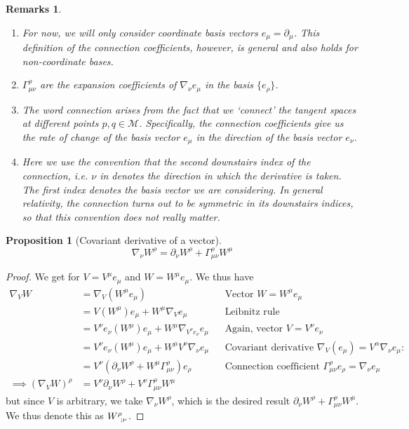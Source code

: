 \documentclass[a4paper]{article}
\newtheorem{remarks}{Remarks}[section]
\theoremstyle{new}
\newtheorem{prop}{Proposition}[section]
\begin{document}
\begin{remarks}\leavevmode
\begin{enumerate}
    \item For now, we will only consider coordinate basis vectors $e_\mu = \partial_\mu$. This definition of the connection coefficients, however, is general and also holds for non-coordinate bases.
    \item $\Gamma_{\mu\nu}^\rho$ are the expansion coefficients of $\nabla_\nu e_\mu$ in the basis $\{e_\rho\}$.
    \item The word connection arises from the fact that we `connect' the tangent spaces at different points $p,q\in\mathcal{M}$. Specifically, the connection coefficients give us the rate of change of the basis vector $e_\mu$ in the direction of the basis vector $e_\nu$.
    \item Here we use the convention that the second downstairs index of the connection, i.e. $\nu$ in denotes the direction in which the derivative is taken. The first index denotes the basis vector we are considering. In general relativity, the connection turns out to be symmetric in its downstairs indices, so that this convention does not really matter.
\end{enumerate}
\end{remarks}
\begin{prop}[Covariant derivative of a vector]
\begin{equation}
\nabla_\nu W^\rho=\partial_\nu W^\rho+\Gamma_{\mu\nu}^\rho W^\mu\label{covderivvector}
\end{equation}
\end{prop}
\begin{proof}
We get for $V=V^\mu e_\mu$ and $W=W^\mu e_\mu$. We thus have
\begin{align}
\nabla_VW&=\nabla_V(W^\mu e_\mu)&&\text{Vector $W=W^\mu e_\mu$}\nonumber\\
&=V(W^\mu)e_\mu+W^\mu\nabla_Ve_\mu&&\text{Leibnitz rule}\nonumber\\
&=V^\nu e_\nu(W^\mu)e_\mu+W^\mu\nabla_{V^\nu e_\nu}e_\mu&&\text{Again, vector $V=V^\nu e_\nu$}\nonumber\\
&=V^\nu e_\nu(W^\mu)e_\mu+W^\mu V^\nu\nabla_{\nu}e_\mu&&\text{Covariant derivative $\nabla_V(e_\mu)=V^\alpha\nabla_\nu e_\mu$:}\nonumber\\
&=V^\nu(\partial_\nu W^\rho+W^\mu\Gamma_{\mu\nu}^\rho)e_\rho&&\text{Connection coefficient $\Gamma^\rho_{\mu\nu}e_\rho=\nabla_\nu e_\mu$}\nonumber\\
\implies(\nabla_VW)^\rho&=V^\nu\partial_\nu W^\rho+V^\nu\Gamma_{\mu\nu}^\rho W^\mu\nonumber
\end{align}
but since $V$ is arbitrary, we take $\nabla_\nu W^\rho$, which is the desired result $\partial_\nu W^\rho+\Gamma_{\mu\nu}^\rho W^\mu$. We thus denote this as $\tensor*{W}{*_{}^{\rho}_{;\nu}}$.
\end{proof}
\end{document}
